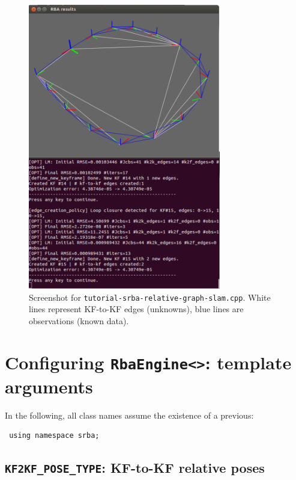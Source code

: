 \documentclass[a4paper,11pt]{article}
\begin{document}
\begin{figure}[h]
\centering
\includegraphics[width=0.75\textwidth]{imgs/screenshot_tutorial_relative-graph-slam-2D.pdf} 
\caption{Screenshot for \texttt{tutorial-srba-relative-graph-slam.cpp}. 
White lines represent KF-to-KF edges (unknowns), blue lines are observations (known data).}
\label{fig:screenshot.tutorial2}
\end{figure}

\newpage

\section{Configuring \texttt{RbaEngine<>}: template arguments}
\label{sect:rba_configs}

In the following, all class names assume the existence of a previous:

\begin{lstlisting}
 using namespace srba;
\end{lstlisting}



\subsection{\texttt{KF2KF\_POSE\_TYPE}: KF-to-KF relative poses}
\label{sec:k2k_types}
\end{document}
